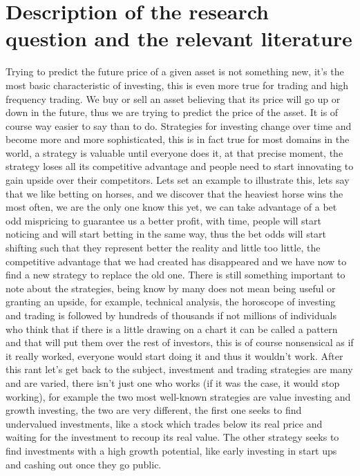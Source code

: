 \documentclass[conference]{IEEEtran}
\begin{document}
\section{Description of the research question and the relevant literature}
Trying to predict the future price of a given asset is not something new, it’s the most basic characteristic of investing, this is even more true for trading and high frequency trading. We buy or sell an asset believing that its price will go up or down in the future, thus we are trying to predict the price of the asset. It is of course way easier to say than to do. Strategies for investing change over time and become more and more sophisticated, this is in fact true for most domains in the world, a strategy is valuable until everyone does it, at that precise moment, the strategy loses all its competitive advantage and people need to start innovating to gain upside over their competitors.  Lets set an example to illustrate this,  lets say that we like betting on horses, and we discover that the heaviest horse wins the most often, we are the only one know this yet, we can take advantage of a bet odd mispricing to guarantee us a better profit, with time, people will start noticing and will start betting in the same way, thus the bet odds will start shifting such that they represent better the reality and little too little, the competitive advantage that we had created has disappeared and we have now to find a new strategy to replace the old one. \newline
\newline
There is still something important to note about the strategies, being know by many does not mean being useful or granting an upside, for example, technical analysis, the horoscope of investing and trading is followed by hundreds of thousands if not millions of individuals who think that if there is a little drawing on a chart it can be called a pattern and that will put them over the rest of investors, this is of course nonsensical as if it really worked, everyone would start doing it and thus it wouldn’t work. After this rant let’s get back to the subject, investment and trading strategies are many and are varied, there isn’t just one who works (if it was the case, it would stop working), for example the two most well-known strategies are value investing and growth investing, the two are very different, the first one seeks to find undervalued investments, like a stock which trades below its real price and waiting for the investment to recoup its real value. The other strategy seeks to find investments with a high growth potential, like early investing in start ups and cashing out once they go public.\newline
\end{document}

